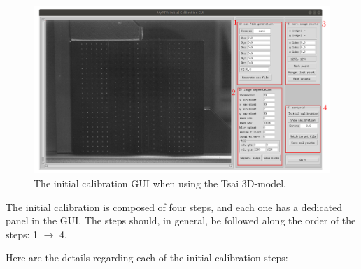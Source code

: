 \documentclass[10pt,a4paper]{article}
\begin{document}
\begin{figure}
	\includegraphics[width=1.0\textwidth]{initial_calibration.pdf}
	\caption{The initial calibration GUI when using the Tsai 3D-model. \label{fig:init_cal_gui}}
\end{figure}


The initial calibration is composed of four steps, and each one has a dedicated panel in the GUI. The steps should, in general, be followed along the order of the steps: 1 $\rightarrow$ 4.   


Here are the details regarding each of the initial calibration steps:
\end{document}

